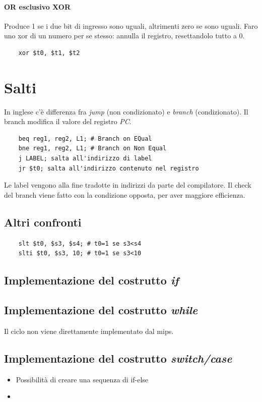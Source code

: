 \documentclass[class=book, crop=false]{standalone}
\begin{document}
\paragraph{OR esclusivo XOR}
Produce 1 se i due bit di ingresso sono uguali, altrimenti zero se sono uguali. Faro uno xor di un numero per se stesso: annulla il registro, resettandolo tutto a 0.
\begin{verbatim}
	xor $t0, $t1, $t2
\end{verbatim}

\section{Salti}
In inglese c'è differenza fra \emph{jump} (non condizionato) e \emph{branch} (condizionato). Il branch modifica il valore del registro \emph{PC}.\\
\begin{verbatim}
	beq reg1, reg2, L1; # Branch on EQual
	bne reg1, reg2, L1; # Branch on Non Equal
	j LABEL; salta all'indirizzo di label
	jr $t0; salta all'indirizzo contenuto nel registro
\end{verbatim}

Le label vengono alla fine tradotte in indirizzi da parte del compilatore.
Il check del branch viene fatto con la condizione opposta, per aver maggiore efficienza.

\subsection{Altri confronti}
\begin{verbatim}
	slt $t0, $s3, $s4; # t0=1 se s3<s4
	slti $t0, $s3, 10; # t0=1 se s3<10
\end{verbatim}


\subsection{Implementazione del costrutto \emph{if}}

\subsection{Implementazione del costrutto \emph{while}}
Il ciclo non viene direttamente implementato dal mips.\\

\subsection{Implementazione del costrutto \emph{switch/case}}
\begin{itemize}
	\item Possibilità di creare una sequenza di if-else
	\item
\end{itemize}
\end{document}

